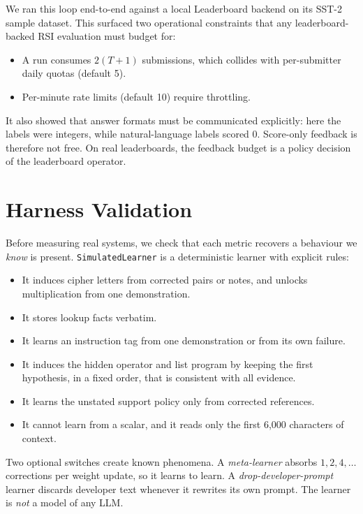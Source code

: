 \documentclass[11pt]{article}
\begin{document}
We ran this loop end-to-end against a local Leaderboard backend on its SST-2 sample dataset. This surfaced two operational constraints that any leaderboard-backed RSI evaluation must budget for:
\begin{itemize}
  \item A run consumes $2(T+1)$ submissions, which collides with per-submitter daily quotas (default 5).
  \item Per-minute rate limits (default 10) require throttling.
\end{itemize}
It also showed that answer formats must be communicated explicitly: here the labels were integers, while natural-language labels scored 0. Score-only feedback is therefore not free. On real leaderboards, the feedback budget is a policy decision of the leaderboard operator.

\section{Harness Validation}
\label{sec:validation}

Before measuring real systems, we check that each metric recovers a behaviour we \emph{know} is present. \texttt{SimulatedLearner} is a deterministic learner with explicit rules:
\begin{itemize}
  \item It induces cipher letters from corrected pairs or notes, and unlocks multiplication from one demonstration.
  \item It stores lookup facts verbatim.
  \item It learns an instruction tag from one demonstration or from its own failure.
  \item It induces the hidden operator and list program by keeping the first hypothesis, in a fixed order, that is consistent with all evidence.
  \item It learns the unstated support policy only from corrected references.
  \item It cannot learn from a scalar, and it reads only the first 6{,}000 characters of context.
\end{itemize}
Two optional switches create known phenomena. A \emph{meta-learner} absorbs $1, 2, 4, \dots$ corrections per weight update, so it learns to learn. A \emph{drop-developer-prompt} learner discards developer text whenever it rewrites its own prompt. The learner is \emph{not} a model of any LLM.
\end{document}
